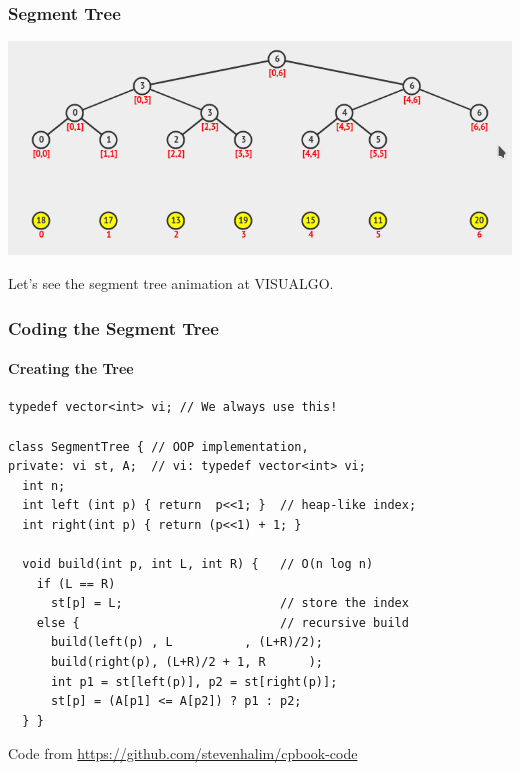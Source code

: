 \documentclass{beamer}
\begin{document}
\begin{frame}
  \frametitle{Segment Tree}
  \begin{center}
    \includegraphics[width=1\textwidth]{img/segment_tree}
  \end{center}

  \bigskip

  Let's see the segment tree animation at VISUALGO.
\end{frame}

\begin{frame}[fragile]
  \frametitle{Coding the Segment Tree}
  \framesubtitle{Creating the Tree}
{\smaller
\begin{block}{}
\begin{verbatim}
typedef vector<int> vi; // We always use this!

class SegmentTree { // OOP implementation,
private: vi st, A;  // vi: typedef vector<int> vi;
  int n;
  int left (int p) { return  p<<1; }  // heap-like index;
  int right(int p) { return (p<<1) + 1; }

  void build(int p, int L, int R) {   // O(n log n)
    if (L == R)
      st[p] = L;                      // store the index
    else {                            // recursive build
      build(left(p) , L          , (L+R)/2);
      build(right(p), (L+R)/2 + 1, R      );
      int p1 = st[left(p)], p2 = st[right(p)];
      st[p] = (A[p1] <= A[p2]) ? p1 : p2;
  } }
\end{verbatim}
\end{block}}

\hfill\footnotesize{Code from \url{https://github.com/stevenhalim/cpbook-code}}

\end{frame}
\end{document}
